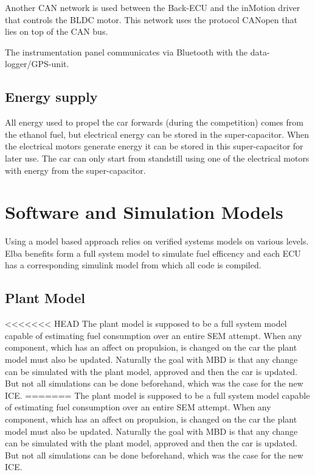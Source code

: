 Another CAN network is used between the Back-ECU and the inMotion driver that
controls the BLDC motor. This network uses the protocol CANopen that
lies on top of the CAN bus.

The instrumentation panel communicates via Bluetooth with the data-logger/GPS-unit.

\subsection{Energy supply}
All energy used to propel the car forwards (during the competition) comes from
the ethanol fuel, but electrical energy can be stored in the super-capacitor.
When the electrical motors generate energy it can be stored in this
super-capacitor for later use. The car can only start from standstill using one
of the electrical motors with energy from the super-capacitor.  

\section{Software and Simulation Models}
Using a model based approach relies on verified systems models on various
levels. Elba benefits form a full system model to simulate fuel efficency and
each ECU has a corresponding simulink model from which all code is compiled.

\subsection{Plant Model}
<<<<<<< HEAD
The plant model is supposed to be a full system model capable of estimating fuel
consumption over an entire SEM attempt. When any component, which has an affect
on propulsion, is changed on the car the plant model must also be updated.
Naturally the goal with MBD is that any change can be simulated with the plant
model, approved and then the car is updated. But not all simulations can be done
beforehand, which was the case for the new ICE.\@
=======
The plant model is supposed to be a full system model capable of estimating fuel consumption over an entire SEM attempt. When any component, which has an affect on propulsion, is changed on the car the plant model must also be updated. Naturally the goal with MBD is that any change can be simulated with the plant model, approved and then the car is updated. But not all simulations can be done beforehand, which was the case for the new ICE. 

